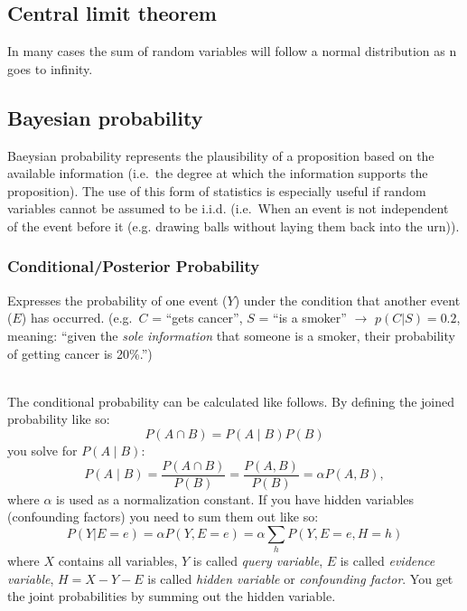 \documentclass[
]{book}
\begin{document}
\hypertarget{CLT}{%
\subsection{Central limit theorem}\label{CLT}}

In many cases the sum of random variables will follow a normal
distribution as n goes to infinity.

\hypertarget{bayesian-probability}{%
\subsection{Bayesian probability}\label{bayesian-probability}}

Baeysian probability represents the plausibility of a proposition based
on the available information (i.e.~the degree at which the information
supports the proposition). The use of this form of statistics is
especially useful if random variables cannot be assumed to be i.i.d.
(i.e.~When an event is not independent of the event before it (e.g.
drawing balls without laying them back into the urn)).

\hypertarget{conditionalposterior-probability}{%
\subsubsection{Conditional/Posterior Probability}\label{conditionalposterior-probability}}

Expresses the probability of one event (\(Y\)) under the condition that
another event (\(E\)) has occurred. (e.g.~\(C\) = ``gets cancer'', \(S\) = ``is a
smoker'' \(\rightarrow\) \(p(C|S)=0.2\), meaning: ``given the \emph{sole
information} that someone is a smoker, their probability of getting
cancer is 20\%.'')\\
\strut \\
The conditional probability can be calculated like follows. By defining
the joined probability like so: \[P(A \cap B) = P(A \mid B) P(B)\] you
solve for \(P(A \mid B)\):
\[P(A \mid B) = \frac{P(A \cap B)}{P(B)}=\frac{P(A, B)}{P(B)}=\alpha{P(A, B)},\]
where \(\alpha\) is used as a normalization constant. If you have hidden
variables (confounding factors) you need to sum them out like so:
\[P(Y|E=e)=\alpha P(Y,E=e)=\alpha\sum_h P(Y,E=e,H=h)\] where \(X\)
contains all variables, \(Y\) is called \emph{query variable}, \(E\) is called
\emph{evidence variable}, \(H=X-Y-E\) is called \emph{hidden variable} or
\emph{confounding factor}. You get the joint probabilities by summing out the
hidden variable.
\end{document}
